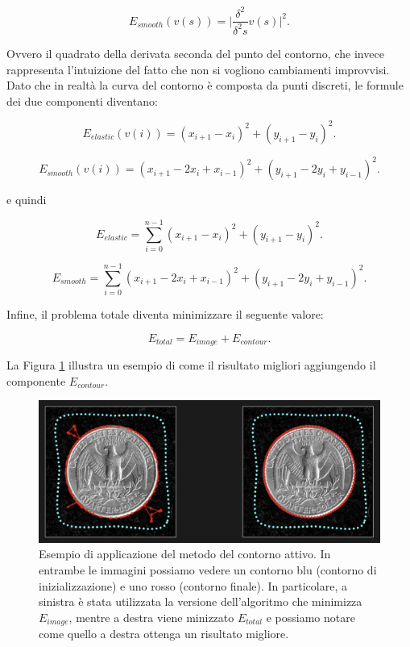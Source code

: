 \begin{equation}
    E_{smooth}(v(s)) = \bigg|  \frac{\delta^{2}}{\delta^{2} s} v(s)  \bigg|^{2}.
\end{equation}

Ovvero il quadrato della derivata seconda del punto del contorno, che invece rappresenta l'intuizione del fatto che non si vogliono cambiamenti improvvisi. Dato che in realtà la curva del contorno è composta da punti discreti, le formule dei due componenti diventano:


\begin{equation}
    E_{elastic}(v(i)) = (x_{i+1} - x_{i})^{2} + (y_{i+1} - y_{i})^{2}.
\end{equation}

\begin{equation}
    E_{smooth}(v(i)) = (x_{i+1} -  2x_{i} + x_{i-1})^{2} + (y_{i+1} -  2y_{i} + y_{i-1})^{2}.
\end{equation}

e quindi

\begin{equation}
    E_{elastic} = \sum_{i=0}^{n-1}{(x_{i+1} - x_{i})^{2} + (y_{i+1} - y_{i})^{2}}.
\end{equation}

\begin{equation}
    E_{smooth} = \sum_{i=0}^{n-1}{(x_{i+1} -  2x_{i} + x_{i-1})^{2} + (y_{i+1} -  2y_{i} + y_{i-1})^{2}}.
\end{equation}


Infine, il problema totale diventa minimizzare il seguente valore:

\begin{equation}
    E_{total} = E_{image} + E_{contour}.
\end{equation}

La Figura \ref{fig:coin-contour} illustra un esempio di come il risultato migliori aggiungendo il componente $E_{contour}$.
\\
\begin{figure}[h!]
    \centering
    \includegraphics[scale=0.35]{img/activ_cont3.png}
    \caption{Esempio di applicazione del metodo del contorno attivo. In entrambe le immagini possiamo vedere un contorno blu (contorno di inizializzazione) e uno rosso (contorno finale). In particolare, a sinistra è stata utilizzata la versione dell'algoritmo che minimizza $E_{image}$, mentre a destra viene minizzato $E_{total}$ e possiamo notare come quello a destra ottenga un risultato migliore.}
    \label{fig:coin-contour}
\end{figure}

